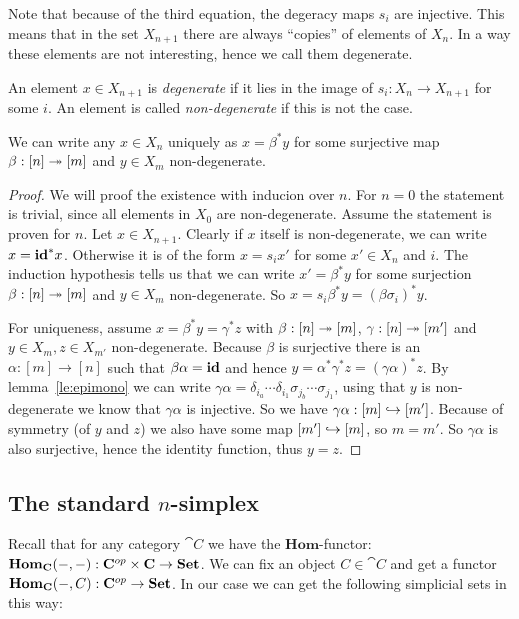 Note that because of the third equation, the degeracy maps $s_i$ are injective. This means that in the set $X_{n+1}$ there are always ``copies'' of elements of $X_n$. In a way these elements are not interesting, hence we call them degenerate.
\begin{definition}
	An element $x \in X_{n+1}$ is \emph{degenerate} if it lies in the image of $s_i : X_n \to X_{n+1}$ for some $i$. An element is called \emph{non-degenerate} if this is not the case.
\end{definition}
\begin{lemma}
	We can write any $x \in X_n$ uniquely as $x = \beta^\ast y$ for some surjective map $\beta : [n] \twoheadrightarrow [m]$ and $y \in X_m$ non-degenerate.
\end{lemma}
\begin{proof}
	We will proof the existence with inducion over $n$. For $n=0$ the statement is trivial, since all elements in $X_0$ are non-degenerate. Assume the statement is proven for $n$. Let $x \in X_{n+1}$. Clearly if $x$ itself is non-degenerate, we can write $x = \mathbf{id}^\ast x$. Otherwise it is of the form $x = s_i x'$ for some $x' \in X_n$ and $i$. The induction hypothesis tells us that we can write $x' = \beta^\ast y$ for some surjection $\beta: [n] \twoheadrightarrow [m]$ and $y \in X_m$ non-degenerate. So $x = s_i \beta^\ast y = (\beta \sigma_i)^\ast y$.

	For uniqueness, assume $x = \beta^\ast y = \gamma^\ast z$ with $\beta : [n] \twoheadrightarrow [m]$, $\gamma: [n] \twoheadrightarrow [m']$ and $y \in X_m, z \in X_{m'}$ non-degenerate. Because $\beta$ is surjective there is an $\alpha:[m]\to[n]$ such that $\beta\alpha = \mathbf{id}$ and hence $y = \alpha^\ast \gamma^\ast z = (\gamma\alpha)^\ast z$. By lemma~\ref{le:epimono} we can write $\gamma\alpha = \delta_{i_a} \cdots \delta_{i_1} \sigma_{j_b} \cdots \sigma_{j_1}$, using that $y$ is non-degenerate we know that $\gamma\alpha$ is injective. So we have $\gamma\alpha: [m] \hookrightarrow [m']$. Because of symmetry (of $y$ and $z$) we also have some map $[m'] \hookrightarrow[m]$, so $m = m'$. So $\gamma\alpha$ is also surjective, hence the identity function, thus $y = z$.
\end{proof}

\subsection{The standard $n$-simplex}
Recall that for any category $\cat{C}$ we have the $\mathbf{Hom}$-functor: $\mathbf{Hom}_{\mathbf{C}}(-, -) : \mathbf{C}^{op} \times \mathbf{C} \to \mathbf{Set}$. We can fix an object $C \in \cat{C}$ and get a functor $\mathbf{Hom}_{\mathbf{C}}(-, C) : \mathbf{C}^{op} \to \mathbf{Set}$. In our case we can get the following simplicial sets in this way:

